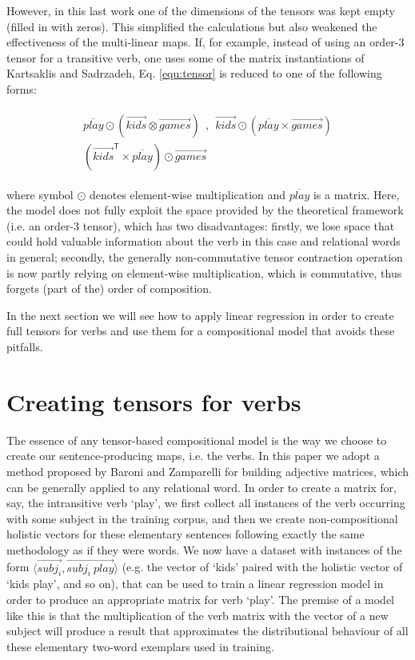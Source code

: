 \documentclass[11pt]{article}
\newcommand{\ov}{\overrightarrow}
\begin{document}
However, in this last work one of the dimensions of the tensors was kept empty (filled in with zeros). This simplified the calculations but also weakened the effectiveness of the multi-linear maps. If, for example, instead of using an order-3 tensor for a transitive verb, one uses some of the  matrix instantiations of Kartsaklis and Sadrzadeh, Eq. \ref{equ:tensor} is reduced to one of the following forms:

\small
\vspace{-0.5cm}
\begin{align}
\begin{split}
\overline{play} \odot (\ov{kids} \otimes \ov{games})~~,~~
  \ov{kids} \odot (\overline{play} \times \ov{games}) \\ 
  (\ov{kids}^{\mathsf{T}} \times \overline{play}) \odot \ov{games}
  ~~~~~~~~~~~~~~~~~~~~~~~
\end{split}  
\end{align}
\vspace{-0.3cm}
\normalsize

\noindent where symbol $\odot$ denotes element-wise multiplication and $\overline{play}$ is a matrix. Here, the model does not fully exploit the space provided by the theoretical framework (i.e. an order-3 tensor), which has two disadvantages: firstly, we lose space that could hold valuable information about the verb in this case and relational words in general; secondly, the generally  non-commutative tensor contraction operation is now partly relying on element-wise multiplication, which is commutative, thus forgets (part of the) order of composition. 

In the next section we will see how to apply linear regression in order to create full tensors for verbs and use them for a compositional model that avoids these pitfalls.

\section{Creating tensors for verbs}
\label{sec:regression}

The essence of any tensor-based compositional model is the way we choose to create our sentence-producing maps, i.e. the verbs. In this paper we adopt a method proposed by Baroni and Zamparelli  for building adjective matrices, which can be generally applied to any relational word. In order to create a matrix for, say, the intransitive verb `play', we first collect all instances of the verb occurring with some subject in the training corpus, and then we create non-compositional holistic vectors for these elementary sentences following exactly the same methodology as if they were words. We now have a dataset with instances of the form $\langle \ov{subj_i}, \ov{subj_i~play} \rangle$ (e.g. the vector of `kids' paired with the holistic vector of `kids play', and so on), that can be used to train a linear regression model in order to produce an appropriate matrix for verb `play'. The premise of a model like this is that the multiplication of the verb matrix with the vector of a new subject will produce a result that approximates the distributional behaviour of all these elementary two-word exemplars used in training. 
\end{document}
